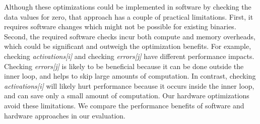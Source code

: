 Although these optimizations could be implemented in software by checking the data values for zero, that approach has a couple of practical limitations.   First, it requires software changes which might not be possible for existing binaries.   Second, the required software checks incur both compute and memory overheads, which could be significant and outweigh the optimization benefits.  For example, checking \emph{activations[i]} and checking \emph{errors[j]} have different performance impacts.  Checking \emph{errors[j]} is likely to be beneficial because it can be done outside the inner loop, and helps to skip large amounts of computation. In contrast, checking \emph{activations[i]} will likely hurt performance because it occurs inside the inner loop, and can save only a small amount of computation. Our hardware optimizations  avoid these limitations.  We compare the performance benefits of software and hardware  approaches in our evaluation. 



